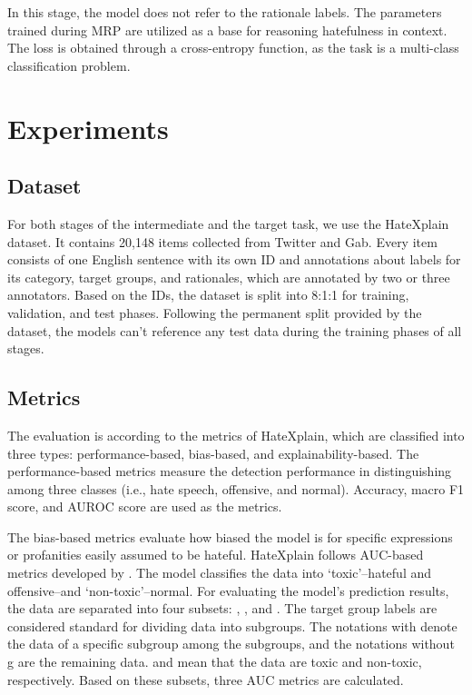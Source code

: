 \documentclass[11pt]{article}
\begin{document}
In this stage, the model does not refer to the rationale labels. The parameters trained during MRP are utilized as a base for reasoning hatefulness in context. The loss  is obtained through a cross-entropy function, as the task is a multi-class classification problem.



\section{Experiments}
\subsection{Dataset}
For both stages of the intermediate and the target task, we use the HateXplain dataset. It contains 20,148 items collected from Twitter and Gab. Every item consists of one English sentence with its own ID and annotations about labels for its category, target groups, and rationales, which are annotated by two or three annotators. Based on the IDs, the dataset is split into 8:1:1 for training, validation, and test phases. Following the permanent split provided by the dataset, the models can't reference any test data during the training phases of all stages.


\subsection{Metrics}



The evaluation is according to the metrics of HateXplain, which are classified into three types: performance-based, bias-based, and explainability-based. The performance-based metrics measure the detection performance in distinguishing among three classes (i.e., hate speech, offensive, and normal). Accuracy, macro F1 score, and AUROC score are used as the metrics.

The bias-based metrics evaluate how biased the model is for specific expressions or profanities easily assumed to be hateful. HateXplain follows AUC-based metrics developed by \citet{borkan2019nuanced}. The model classifies the data into ‘toxic’--hateful and offensive--and ‘non-toxic’--normal. For evaluating the model’s prediction results, the data are separated into four subsets: , , and . The target group labels are considered standard for dividing data into subgroups. The notations with  denote the data of a specific subgroup among the subgroups, and the notations without g are the remaining data.  and  mean that the data are toxic and non-toxic, respectively. Based on these subsets, three AUC metrics are calculated.
\end{document}
